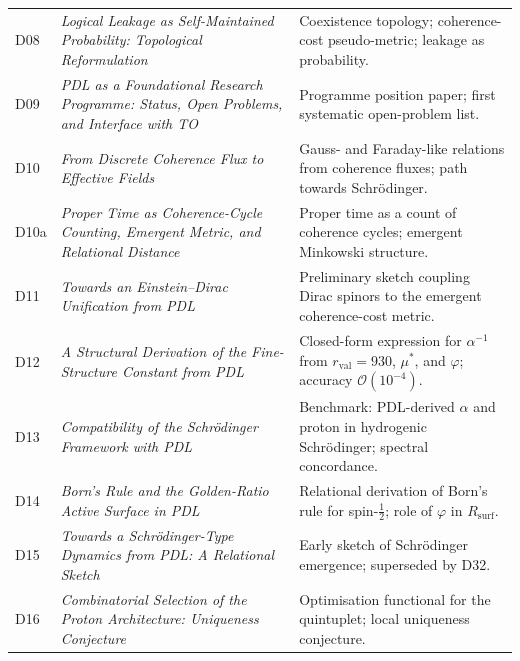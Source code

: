 \documentclass[11pt,a4paper]{article}
\theoremstyle{plain}
\theoremstyle{definition}
\theoremstyle{remark}
\newcommand{\rval}{r_{\mathrm{val}}}
\newcommand{\Rsurf}{R_{\mathrm{surf}}}
\begin{document}
\begin{longtable}{@{}L{1.3cm}L{3.8cm}L{8.0cm}@{}}
D08 & \textit{Logical Leakage as Self-Maintained Probability: Topological Reformulation}~\citep{D08} & Coexistence topology; coherence-cost pseudo-metric; leakage as probability. \\[0.3em]

D09 & \textit{PDL as a Foundational Research Programme: Status, Open Problems, and Interface with TO}~\citep{D09} & Programme position paper; first systematic open-problem list. \\[0.3em]

D10 & \textit{From Discrete Coherence Flux to Effective Fields}~\citep{D10} & Gauss- and Faraday-like relations from coherence fluxes; path towards Schr\"odinger. \\[0.3em]

D10a & \textit{Proper Time as Coherence-Cycle Counting, Emergent Metric, and Relational Distance}~\citep{D10a} & Proper time as a count of coherence cycles; emergent Minkowski structure. \\[0.3em]

D11 & \textit{Towards an Einstein--Dirac Unification from PDL}~\citep{D11} & Preliminary sketch coupling Dirac spinors to the emergent coherence-cost metric. \\[0.3em]

D12 & \textit{A Structural Derivation of the Fine-Structure Constant from PDL}~\citep{D12} & Closed-form expression for $\alpha^{-1}$ from $\rval=930$, $\mu^*$, and $\varphi$; accuracy $\mathcal{O}(10^{-4})$. \\[0.3em]

D13 & \textit{Compatibility of the Schr\"odinger Framework with PDL}~\citep{D13} & Benchmark: PDL-derived $\alpha$ and proton in hydrogenic Schr\"odinger; spectral concordance. \\[0.3em]

D14 & \textit{Born's Rule and the Golden-Ratio Active Surface in PDL}~\citep{D14} & Relational derivation of Born's rule for spin-$\tfrac{1}{2}$; role of $\varphi$ in $\Rsurf$. \\[0.3em]

D15 & \textit{Towards a Schr\"odinger-Type Dynamics from PDL: A Relational Sketch}~\citep{D15} & Early sketch of Schr\"odinger emergence; superseded by D32. \\[0.3em]

D16 & \textit{Combinatorial Selection of the Proton Architecture: Uniqueness Conjecture}~\citep{D16} & Optimisation functional for the quintuplet; local uniqueness conjecture. \\[0.3em]


\end{longtable}
\end{document}
